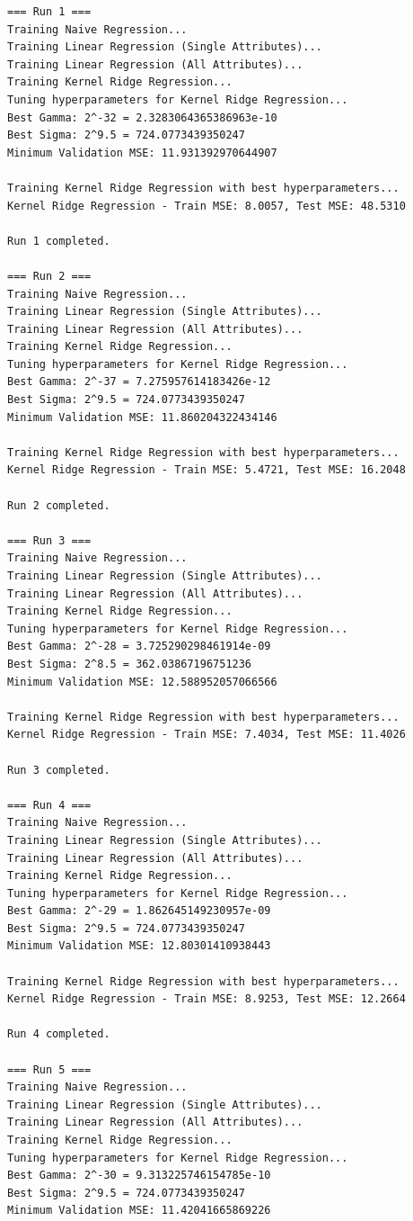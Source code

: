 \documentclass[final,3p,times,12pt]{article}
\begin{document}
\begin{verbatim}
=== Run 1 ===
Training Naive Regression...
Training Linear Regression (Single Attributes)...
Training Linear Regression (All Attributes)...
Training Kernel Ridge Regression...
Tuning hyperparameters for Kernel Ridge Regression...
Best Gamma: 2^-32 = 2.3283064365386963e-10
Best Sigma: 2^9.5 = 724.0773439350247
Minimum Validation MSE: 11.931392970644907

Training Kernel Ridge Regression with best hyperparameters...
Kernel Ridge Regression - Train MSE: 8.0057, Test MSE: 48.5310

Run 1 completed.

=== Run 2 ===
Training Naive Regression...
Training Linear Regression (Single Attributes)...
Training Linear Regression (All Attributes)...
Training Kernel Ridge Regression...
Tuning hyperparameters for Kernel Ridge Regression...
Best Gamma: 2^-37 = 7.275957614183426e-12
Best Sigma: 2^9.5 = 724.0773439350247
Minimum Validation MSE: 11.860204322434146

Training Kernel Ridge Regression with best hyperparameters...
Kernel Ridge Regression - Train MSE: 5.4721, Test MSE: 16.2048

Run 2 completed.

=== Run 3 ===
Training Naive Regression...
Training Linear Regression (Single Attributes)...
Training Linear Regression (All Attributes)...
Training Kernel Ridge Regression...
Tuning hyperparameters for Kernel Ridge Regression...
Best Gamma: 2^-28 = 3.725290298461914e-09
Best Sigma: 2^8.5 = 362.03867196751236
Minimum Validation MSE: 12.588952057066566

Training Kernel Ridge Regression with best hyperparameters...
Kernel Ridge Regression - Train MSE: 7.4034, Test MSE: 11.4026

Run 3 completed.

=== Run 4 ===
Training Naive Regression...
Training Linear Regression (Single Attributes)...
Training Linear Regression (All Attributes)...
Training Kernel Ridge Regression...
Tuning hyperparameters for Kernel Ridge Regression...
Best Gamma: 2^-29 = 1.862645149230957e-09
Best Sigma: 2^9.5 = 724.0773439350247
Minimum Validation MSE: 12.80301410938443

Training Kernel Ridge Regression with best hyperparameters...
Kernel Ridge Regression - Train MSE: 8.9253, Test MSE: 12.2664

Run 4 completed.

=== Run 5 ===
Training Naive Regression...
Training Linear Regression (Single Attributes)...
Training Linear Regression (All Attributes)...
Training Kernel Ridge Regression...
Tuning hyperparameters for Kernel Ridge Regression...
Best Gamma: 2^-30 = 9.313225746154785e-10
Best Sigma: 2^9.5 = 724.0773439350247
Minimum Validation MSE: 11.42041665869226


\end{verbatim}
\end{document}
